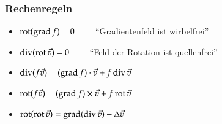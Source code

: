 \subsubsection{Rechenregeln}
\begin{itemize}
	\item $\operatorname{rot}(\operatorname{grad} f) = 0 \qquad $ ``Gradientenfeld ist wirbelfrei''
	\item $\operatorname{div}(\operatorname{rot} \vec{v}) = 0 \qquad $ ``Feld der Rotation ist quellenfrei''
	\item $\operatorname{div}(f\vec{v}) = (\operatorname{grad} f) \cdot \vec{v} + f \operatorname{div} \vec{v}$
	\item $\operatorname{rot}(f\vec{v}) = (\operatorname{grad} f) \times \vec{v} + f \operatorname{rot} \vec{v}$
	\item $\operatorname{rot}(\operatorname{rot} \vec{v}) = \operatorname{grad}(\operatorname{div} \vec{v}) - \Delta \vec{v}$
\end{itemize}
